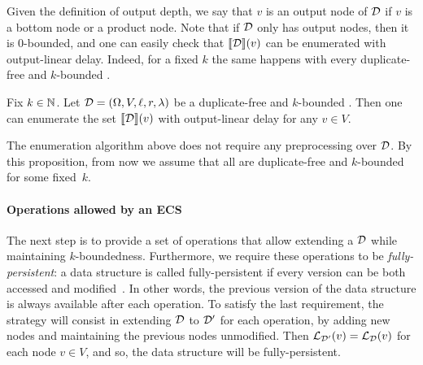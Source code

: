 Given the definition of output depth, we say that $v$ is an output node of $\mathcal{D}$ if $v$ is a bottom node or a product node. 
Note that if $\mathcal{D}$ only has output nodes, then it is 0-bounded, and one can easily check that ${\llbracket{\mathcal{D}}\rrbracket}(v)$ can be enumerated with output-linear delay.
Indeed, for a fixed $k$ the same happens with every duplicate-free and $k$-bounded \dsabbr{}.


\begin{proposition}\label{nested:ds:lindelay}
	Fix $k\in\mathbb{N}$. Let $\mathcal{D} = (\Omega, V, \ell, r, \lambda)$ be a duplicate-free and $k$-bounded \dsabbr{}. Then one can enumerate the set ${\llbracket{\mathcal{D}}\rrbracket}(v)$ with output-linear delay for any $v\in V$.
\end{proposition}

The enumeration algorithm above does not require any preprocessing over $\mathcal{D}$. By this proposition, from now we assume that all \dsabbr{} are duplicate-free and $k$-bounded for some fixed~$k$.




\paragraph{Operations allowed by an ECS}
The next step is to provide a set of operations that allow extending a \dsabbr{} $\mathcal{D}$ while maintaining $k$-boundedness. Furthermore, we require these operations to be \emph{fully-persistent}: a data structure is called fully-persistent if every version can be both accessed and modified~\cite{driscoll1986making}. In other words, the previous version of the data structure is always available after each operation.
To satisfy the last requirement, the strategy will consist in extending $\mathcal{D}$ to $\mathcal{D}'$ for each operation, by adding new nodes and maintaining the previous nodes unmodified. Then $\mathcal{L}_{\mathcal{D}'}(v) = \mathcal{L}_{\mathcal{D}}(v)$ for each node $v \in V$, and so, the data structure will be fully-persistent. 

